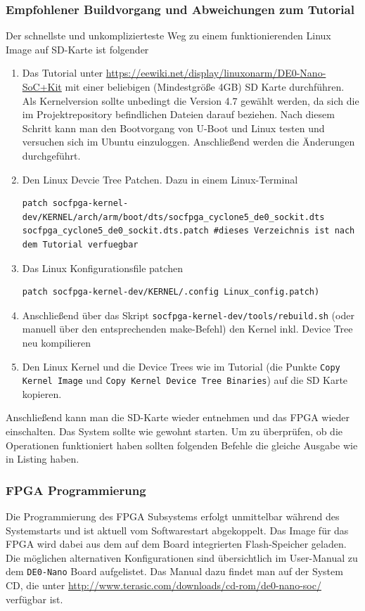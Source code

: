 \subsubsection{Empfohlener Buildvorgang und Abweichungen zum Tutorial}
Der schnellste und unkomplizierteste Weg zu einem funktionierenden Linux Image auf SD-Karte ist folgender
\begin{enumerate}
	\item Das Tutorial unter \href{https://eewiki.net/display/linuxonarm/DE0-Nano-SoC+Kit}{https://eewiki.net/display/linuxonarm/DE0-Nano-SoC+Kit} mit einer beliebigen (Mindestgröße 4GB) SD Karte durchführen. Als Kernelversion sollte unbedingt die Version 4.7 gewählt werden, da sich die im Projektrepository befindlichen Dateien darauf beziehen. Nach diesem Schritt kann man den Bootvorgang von U-Boot und Linux testen und versuchen sich im Ubuntu einzuloggen. Anschließend werden die Änderungen durchgeführt.
	\item Den Linux Devcie Tree Patchen. Dazu in einem Linux-Terminal
\lstset{language=bash}
	\begin{lstlisting}[breaklines=true]
patch socfpga-kernel-dev/KERNEL/arch/arm/boot/dts/socfpga_cyclone5_de0_sockit.dts socfpga_cyclone5_de0_sockit.dts.patch #dieses Verzeichnis ist nach dem Tutorial verfuegbar
	\end{lstlisting}
	\item Das Linux Konfigurationsfile patchen
	\begin{lstlisting}[breaklines=true]
patch socfpga-kernel-dev/KERNEL/.config Linux_config.patch)
	\end{lstlisting}
	\item Anschließend über das Skript \texttt{socfpga-kernel-dev/tools/rebuild.sh} (oder manuell über den entsprechenden make-Befehl) den Kernel inkl. Device Tree neu kompilieren
	\item Den Linux Kernel und die Device Trees wie im Tutorial (die Punkte \texttt{Copy Kernel Image} und \texttt{Copy Kernel Device Tree Binaries}) auf die SD Karte kopieren.
\end{enumerate}

Anschließend kann man die SD-Karte wieder entnehmen und das \ac{FPGA} wieder einschalten. Das System sollte wie gewohnt starten. Um zu überprüfen, ob die Operationen funktioniert haben sollten folgenden Befehle die gleiche Ausgabe wie in Listing  haben. 

\subsubsection{\ac{FPGA} Programmierung}
Die Programmierung des \ac{FPGA} Subsystems erfolgt unmittelbar während des Systemstarts und ist aktuell vom Softwarestart abgekoppelt. Das Image für das \ac{FPGA} wird dabei aus dem auf dem Board integrierten Flash-Speicher geladen. Die möglichen alternativen Konfigurationen sind übersichtlich im User-Manual zu dem \texttt{DE0-Nano} Board aufgelistet. Das Manual dazu findet man auf der System CD, die unter \href{http://www.terasic.com/downloads/cd-rom/de0-nano-soc/}{http://www.terasic.com/downloads/cd-rom/de0-nano-soc/} verfügbar ist.\\

